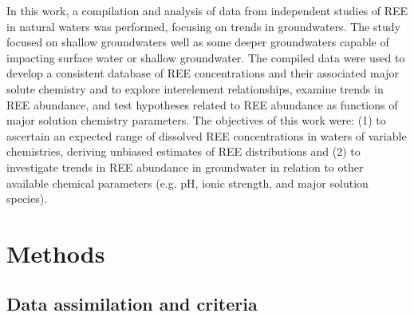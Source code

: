 In this work, a compilation and analysis of data from independent studies of REE in natural waters was performed, focusing on trends in groundwaters.
The study focused on shallow groundwaters well as some deeper groundwaters capable of impacting surface water or shallow groundwater.
The compiled data were used to develop a consistent database of REE concentrations and their associated major solute chemistry and to explore interelement relationships, examine trends in REE abundance, and test hypotheses related to REE abundance as functions of major solution chemistry parameters.
The objectives of this work were: (1) to ascertain an expected range of dissolved REE concentrations in waters of variable chemistries, deriving unbiased estimates of REE distributions and (2) to investigate trends in REE abundance in groundwater in relation to other available chemical parameters (e.g. pH, ionic strength, and major solution species).

\section{Methods}

\subsection{Data assimilation and criteria}

